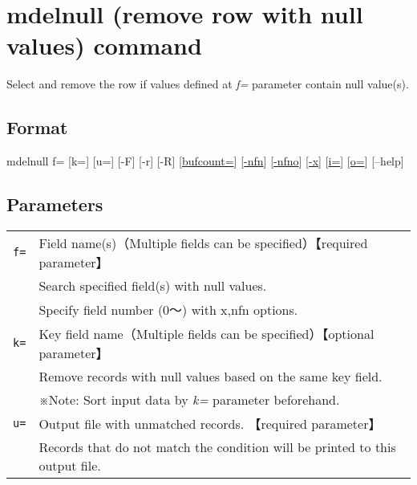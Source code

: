 \documentclass[a4paper]{jarticle}
\begin{document}
\setlength{\baselineskip}{4mm}

\section*{mdelnull (remove row with null values) command}
Select and remove the row if values defined at \emph{f=} parameter contain null value(s). \\

\subsection*{Format}
mdelnull f= [k=] [u=] [-F] [-r] [-R]   
[\href{run:option.pdf}{bufcount=}] 
[\href{run:option.pdf}{-nfn}] 
[\href{run:option.pdf}{-nfno}] 
[\href{run:option.pdf}{-x}] 
[\href{run:option.pdf}{i=}] 
[\href{run:option.pdf}{o=}] 
[--help]\\

\subsection*{Parameters}
\begin{table}[htbp]
{\small
\begin{tabular}{ll}
\verb|f=|    & Field name(s)（Multiple fields can be specified）【required parameter】\\
& Search specified field(s) with null values. \\
& Specify field number (0〜) with x,nfn options. \\
\verb|k=|    & Key field name（Multiple fields can be specified）【optional parameter】\\
& Remove records with null values  based on the same key field. \\
& ※Note: Sort input data by \emph{k=} parameter beforehand. \\
\verb|u=|    & Output file with unmatched records. 【required parameter】\\
& Records that do not match the condition will be printed to this output file. \\
\end{tabular} 
}
\end{table} 
\end{document}
